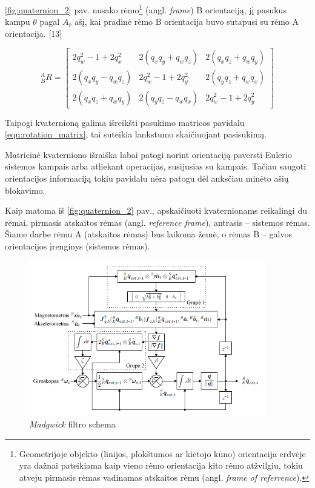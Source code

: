 \documentclass[]{vgtuef}
\begin{document}
\ref{fig:quaternion_2} pav. nusako rėmo\footnote{  Geometrijoje objekto (linijos, plokštumos ar kietojo kūno) orientacija erdvėje yra dažnai pateikiama kaip vieno rėmo orientacija kito rėmo atžvilgiu, tokiu atveju pirmasis rėmas vadinamas atskaitos rėmu (angl. \textit{frame of referrence}).} (angl. \textit{frame}) B orientaciją, jį pasukus kampu $\theta$ pagal $A_{\hat{r}}$  ašį, kai pradinė rėmo B orientacija buvo sutapusi su rėmo A orientacija. [13]

\begin{equation}
_{B}^{A}R = \begin{bmatrix} 
   2q_{w}^{2} - 1 + 2q_{x}^{2} & 2(q_{x}q_{y}+q_{w}q_{z}) & 2(q_{x}q_{z}+q_{w}q_{y})
\\ 2(q_{x}q_{y}-q_{w}q_{z}) & 2q_{w}^{2} - 1 + 2q_{y}^{2} & 2(q_{y}q_{z}+q_{w}q_{x})
\\ 2(q_{x}q_{z}+q_{w}q_{y}) & 2(q_{y}q_{z}-q_{w}q_{x}) & 2q_{w}^{2} - 1 + 2q_{y}^{2}
\end{bmatrix}
\label{equ:rotation_matrix}
\end{equation}

Taipogi kvaternioną galima išreikšti pasukimo matricos pavidalu \ref{equ:rotation_matrix}, tai suteikia lankstumo skaičiuojant pasisukimą.

Matricinė kvaterniono išraiška labai patogi norint orientaciją paversti Eulerio sistemos kampais arba atliekant operacijas, susijusias su kampais. Tačiau saugoti orientacijos informaciją tokiu pavidalu nėra patogu dėl anksčiau minėto ašių blokavimo. 

Kaip matoma iš \ref{fig:quaternion_2} pav., apskaičiuoti kvaternionams reikalingi du rėmai, pirmasis atskaitos rėmas (angl. \textit{reference frame}), antrasis -- sistemos rėmas. Šiame darbe rėmu A (atskaitos rėmas) bus laikoma žemė, o rėmas B – galvos orientacijos įrenginys (sistemos rėmas).

\begin{figure}[htbp]
  \centering
  \includegraphics[width=390px]{img/madgwick.png}
  \caption{\textit{Madgwick} filtro schema}
  \label{fig:madgwick}
\end{figure}
\end{document}

